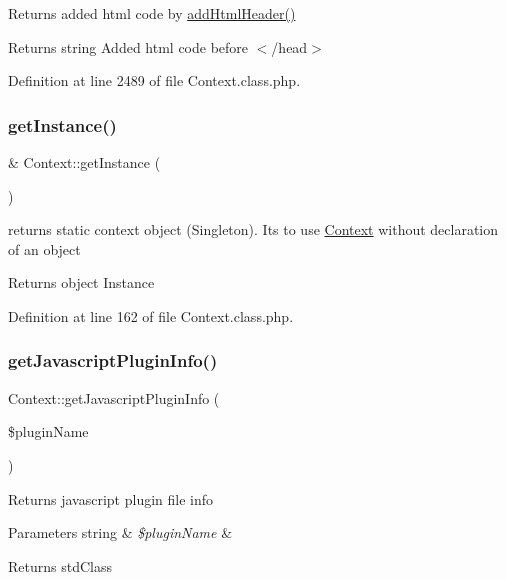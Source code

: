 Returns added html code by \hyperlink{classContext_a26a1aea944ae54bb826500f544a67950}{add\+Html\+Header()}

\begin{DoxyReturn}{Returns}
string Added html code before $<$/head$>$ 
\end{DoxyReturn}


Definition at line 2489 of file Context.\+class.\+php.

\mbox{\label{classContext_a399e419617c7fe9b0c9eaf22c431df69}} 
\subsubsection{\texorpdfstring{get\+Instance()}{getInstance()}}
{\footnotesize\ttfamily \& Context\+::get\+Instance (\begin{DoxyParamCaption}{ }\end{DoxyParamCaption})}

returns static context object (Singleton). It\textquotesingle{}s to use \hyperlink{classContext}{Context} without declaration of an object

\begin{DoxyReturn}{Returns}
object Instance 
\end{DoxyReturn}


Definition at line 162 of file Context.\+class.\+php.

\mbox{\label{classContext_abf616bb3259e090c6e85b3aa1b581b60}} 
\subsubsection{\texorpdfstring{get\+Javascript\+Plugin\+Info()}{getJavascriptPluginInfo()}}
{\footnotesize\ttfamily Context\+::get\+Javascript\+Plugin\+Info (\begin{DoxyParamCaption}\item[{}]{\$plugin\+Name }\end{DoxyParamCaption})}

Returns javascript plugin file info 
\begin{DoxyParams}[1]{Parameters}
string & {\em \$plugin\+Name} & \\
\hline
\end{DoxyParams}
\begin{DoxyReturn}{Returns}
std\+Class 
\end{DoxyReturn}


